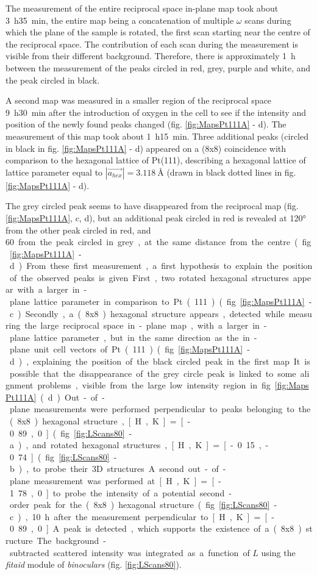 The measurement of the entire reciprocal space in-plane map took about \qty{3}{\hour}\qty{35}{\minute}, the entire map being a concatenation of multiple $\omega$ scans during which the plane of the sample is rotated, the first scan starting near the centre of the reciprocal space.
The contribution of each scan during the measurement is visible from their different background.
Therefore, there is approximately \qty{1}{\hour} between the measurement of the peaks circled in red, grey, purple and white, and the peak circled in black.

A second map was measured in a smaller region of the reciprocal space \qty{9}{\hour}\qty{30}{\minute} after the introduction of oxygen in the cell to see if the intensity and position of the newly found peaks changed (fig. \ref{fig:MapsPt111A} - d).
The measurement of this map took about \qty{1}{\hour}\qty{15}{\minute}.
Three additional peaks (circled in black in fig. \ref{fig:MapsPt111A} - d) appeared on a (8x8) coincidence with comparison to the hexagonal lattice of Pt(111), describing a hexagonal lattice of lattice parameter equal to $|\vec{a_{hex}}| = \qty{3.118}{\angstrom}$ (drawn in black dotted lines in fig. \ref{fig:MapsPt111A} - d).

The grey circled peak seems to have disappeared from the reciprocal map (fig. \ref{fig:MapsPt111A}, c, d), but an additional peak circled in red is revealed at \ang{120} from the other peak circled in red, and \qty{60} from the peak circled in grey, at the same distance from the centre (fig. \ref{fig:MapsPt111A} - d).
From these first measurement, a first hypothesis to explain the position of the observed peaks is given.
First, two rotated hexagonal structures appear with a larger in-plane lattice parameter in comparison to Pt(111) (fig. \ref{fig:MapsPt111A} - c).
Secondly, a (8x8) hexagonal structure appears, detected while measuring the large reciprocal space in-plane map, with a larger in-plane lattice parameter, but in the same direction as the in-plane unit cell vectors of Pt(111) (fig. \ref{fig:MapsPt111A} - d), explaining the position of the black circled peak in the first map.
It is possible that the disappearance of the grey circle peak is linked to some alignment problems, visible from the large low intensity region in fig. \ref{fig:MapsPt111A} (d).

Out-of-plane measurements were performed perpendicular to peaks belonging to the (8x8) hexagonal structure, [H, K] = [-0.89, 0] (fig. \ref{fig:LScans80} - a), and rotated hexagonal structures, [H, K] = [-0.15, -0.74] (fig. \ref{fig:LScans80} - b), to probe their 3D structures.
A second out-of-plane measurement was performed at [H, K] = [-1.78, 0] to probe the intensity of a potential second-order peak for the (8x8) hexagonal structure (fig. \ref{fig:LScans80} - c), \qty{10}{\hour} after the measurement perpendicular to [H, K] = [-0.89, 0].
A peak is detected, which supports the existence of a (8x8) structure.
The background-subtracted scattered intensity was integrated as a function of $L$ using the \textit{fitaid} module of \textit{binoculars} (fig. \ref{fig:LScans80}).

